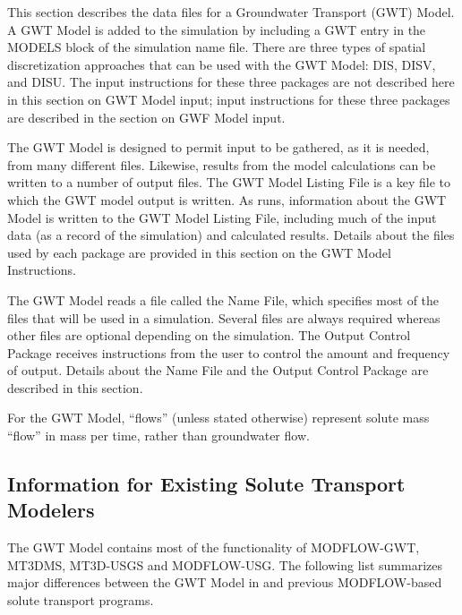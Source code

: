 This section describes the data files for a \mf Groundwater Transport (GWT) Model.  A GWT Model is added to the simulation by including a GWT entry in the MODELS block of the simulation name file.  There are three types of spatial discretization approaches that can be used with the GWT Model: DIS, DISV, and DISU.  The input instructions for these three packages are not described here in this section on GWT Model input; input instructions for these three packages are described in the section on GWF Model input.

The GWT Model is designed to permit input to be gathered, as it is needed, from many different files.  Likewise, results from the model calculations can be written to a number of output files. The GWT Model Listing File is a key file to which the GWT model output is written.  As \mf runs, information about the GWT Model is written to the GWT Model Listing File, including much of the input data (as a record of the simulation) and calculated results.  Details about the files used by each package are provided in this section on the GWT Model Instructions.

The GWT Model reads a file called the Name File, which specifies most of the files that will be used in a simulation. Several files are always required whereas other files are optional depending on the simulation. The Output Control Package receives instructions from the user to control the amount and frequency of output.  Details about the Name File and the Output Control Package are described in this section.

For the GWT Model, ``flows'' (unless stated otherwise) represent solute mass ``flow'' in mass per time, rather than groundwater flow.  

\subsection{Information for Existing Solute Transport Modelers}
The \mf GWT Model contains most of the functionality of MODFLOW-GWT, MT3DMS, MT3D-USGS and MODFLOW-USG.  The following list summarizes major differences between the GWT Model in \mf and previous MODFLOW-based solute transport programs.

